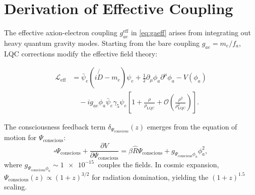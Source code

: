 \documentclass[11pt,a4paper,preprint]{article}
\newcommand{\Psicon}{\Psi_{\mathrm{conscious}}}
\newcommand{\phia}{\phi_a}
\newcommand{\Rhat}{\hat{R}}
\newcommand{\gAe}{g_{ae}^{\mathrm{eff}}}
\newcommand{\rhoLQC}{\rho_{\mathrm{LQC}}}
\begin{document}
\section{Derivation of Effective Coupling}\label{app:derivation}

The effective axion-electron coupling $\gAe$ in \cref{eq:gaeff} arises from integrating out heavy quantum gravity modes. Starting from the bare coupling $g_{ae} = m_e / f_a$, LQC corrections modify the effective field theory:

\begin{align}
    \mathcal{L}_{\mathrm{eff}} &= \bar{\psi}_e (i \not{D} - m_e) \psi_e + \frac{1}{2} \partial_\mu \phia \partial^\mu \phia - V(\phia) \nonumber \\
    &\quad - i g_{ae} \phia \bar{\psi}_e \gamma_5 \psi_e \left[1 + \frac{\rho}{\rhoLQC} + \mathcal{O}\left(\frac{\rho^2}{\rhoLQC^2}\right)\right].
\end{align}

The consciousness feedback term $\delta_\Psicon(z)$ emerges from the equation of motion for $\Psicon$:
\begin{equation}
    \square \Psicon + \frac{\partial V}{\partial \Psicon} = \beta \Rhat \Psicon + g_{\Psicon \phia} \phia^2,
\end{equation}
where $g_{\Psicon \phia} \sim \SI{1e-15}{}$ couples the fields. In cosmic expansion, $\Psicon(z) \propto (1+z)^{3/2}$ for radiation domination, yielding the $(1+z)^{1.5}$ scaling.
\end{document}
